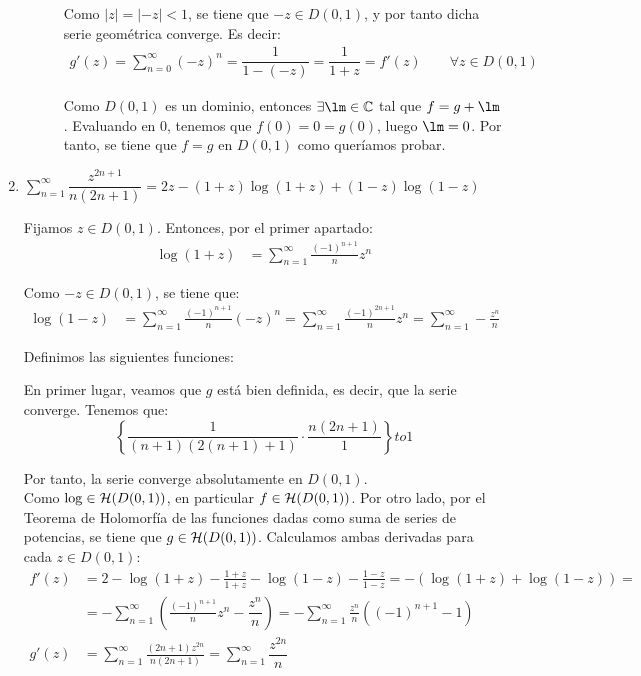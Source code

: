 \begin{ejercicio}
\begin{enumerate}
\begin{description}
            Como $|z|=|-z|<1$, se tiene que $-z\in D(0,1)$, y por tanto dicha serie geométrica converge. Es decir:
            \begin{align*}
                g'(z) = \sum_{n=0}^\infty (-z)^{n}
                = \dfrac{1}{1-(-z)} = \dfrac{1}{1+z} = f'(z)\qquad \forall z\in D(0,1)
            \end{align*}

            Como $D(0,1)$ es un dominio, entonces $\exists \lm\in \bb{C}$ tal que $f=g+\lm$. Evaluando en $0$, tenemos que $f(0)=0=g(0)$, luego $\lm=0$. Por tanto, se tiene que $f=g$ en $D(0,1)$ como queríamos probar.
        \end{description}
        \item $\sum\limits_{n= 1}^\infty \dfrac{z^{2n+1}}{n(2n+1)} = 2z - (1+z)\log(1+z) + (1-z)\log(1-z)$
            
        Fijamos $z\in D(0,1)$. Entonces, por el primer apartado:
        \begin{align*}
            \log(1+z) &= \sum_{n=1}^\infty \frac{(-1)^{n+1}}{n}z^n
        \end{align*}

        Como $-z\in D(0,1)$, se tiene que:
        \begin{align*}
            \log(1-z) &= \sum_{n=1}^\infty \frac{(-1)^{n+1}}{n}(-z)^n = \sum_{n=1}^\infty \frac{(-1)^{2n+1}}{n}z^n
            = \sum_{n=1}^\infty -\frac{z^n}{n}
        \end{align*}

        Definimos las siguientes funciones:

        En primer lugar, veamos que $g$ está bien definida, es decir, que la serie converge. Tenemos que:
        \begin{equation*}
            \left\{\dfrac{1}{(n+1)(2(n+1)+1)}\cdot \dfrac{n(2n+1)}{1}\right\}to 1
        \end{equation*}

        Por tanto, la serie converge absolutamente en $D(0,1)$.\\

        Como $\log\in \mathcal{H}(D(0,1))$, en particular $f\in \mathcal{H}(D(0,1))$. Por otro lado, por el Teorema de Holomorfía de las funciones dadas como suma de series de potencias, se tiene que $g\in \mathcal{H}(D(0,1))$. Calculamos ambas derivadas para cada $z\in D(0,1)$:
        \begin{align*}
            f'(z) &= 2 - \log(1+z) - \frac{1+z}{1+z} - \log(1-z) - \frac{1-z}{1-z} = -\left(\log(1+z) + \log(1-z)\right)
            =\\&= -\sum_{n=1}^\infty \left(\frac{(-1)^{n+1}}{n}z^n - \dfrac{z^n}{n}\right) = -\sum_{n=1}^\infty \frac{z^n}{n}\left((-1)^{n+1}-1\right)\\
            g'(z) &= \sum_{n=1}^\infty \frac{(2n+1)z^{2n}}{n(2n+1)} = \sum_{n=1}^\infty \dfrac{z^{2n}}{n}
        \end{align*}


\end{enumerate}
\end{ejercicio}
